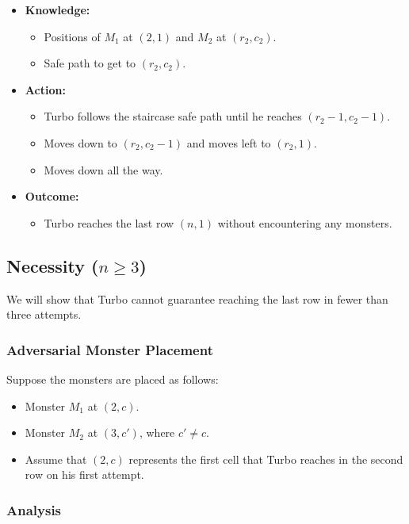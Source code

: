 \begin{tcolorbox}[enhanced, breakable, rounded corners,
    colback=gray!5!white, colframe=gray!75!black,
    colbacktitle=gray!85!black, fonttitle=\bfseries, coltitle=white, title=2024 IMO Problem 5]
\begin{itemize}
    \item \textbf{Knowledge:}
    \begin{itemize}
        \item Positions of $ M_1 $ at $ (2, 1) $ and $ M_2 $ at $ (r_2, c_2) $.
        \item Safe path to get to $ (r_2, c_2) $.
    \end{itemize}
    \item \textbf{Action:}
    \begin{itemize}
        \item Turbo follows the staircase safe path until he reaches $ (r_2 - 1, c_2 - 1) $.
        \item Moves down to $ (r_2, c_2 - 1) $ and moves left to $ (r_2, 1) $.
        \item Moves down all the way.
        
    \end{itemize}
    \item \textbf{Outcome:}
    \begin{itemize}
        \item Turbo reaches the last row $ (n, 1) $ without encountering any monsters.
    \end{itemize}
\end{itemize}


\subsection*{Necessity (\( n \geq 3 \))}

We will show that Turbo cannot guarantee reaching the last row in fewer than three attempts.

\subsubsection*{Adversarial Monster Placement}
Suppose the monsters are placed as follows:
\begin{itemize}
    \item Monster \( M_1 \) at \( (2, c) \).
    \item Monster \( M_2 \) at \( (3, c') \), where \( c' \neq c \).
    \item Assume that \( (2, c) \) represents the first cell that Turbo reaches in the second row on his first attempt.
\end{itemize}

\subsubsection*{Analysis} 


\end{tcolorbox}
